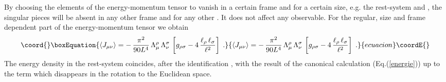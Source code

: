 \documentclass[a4paper,twocolumn,eqsecnum,aps]{revtex4}
\begin{document}
By choosing the elements of the energy-momentum tensor to vanish in a certain frame 
and for a certain size, e.g. the rest-system and  \coordHE{} , the singular pieces will be absent 
in any other frame and for any other \coordHE{}. It does not affect any observable. For the regular, size and frame dependent part of the energy-momentum tensor we obtain   
\begin{equation}\coord{}\boxEquation{
  \label{energy2}
\langle J_{\mu\nu}\rangle = - \,\frac{\pi^2}{90 L^4}\, \Lambda_{\mu}^{\rho} \,
\Lambda_{\nu}^{\sigma} \,\left[g_{\rho\sigma}-4 \,\frac{\ell _{\rho}\, \ell _{\sigma}}{\ell^2}\right]\; .}{
  \langle J_{\mu\nu}\rangle = - \,\frac{\pi^2}{90 L^4}\, \Lambda_{\mu}^{\rho} \,
\Lambda_{\nu}^{\sigma} \,\left[g_{\rho\sigma}-4 \,\frac{\ell _{\rho}\, \ell _{\sigma}}{\ell^2}\right]\; .}{ecuacion}\coordE{}\end{equation}
The energy density in the rest-system  coincides, after  the identification
 \coordHE{}, with the result of the canonical calculation (Eq.(\ref{energie})) 
 up to the \coordHE{} term which disappears in the rotation to the Euclidean space. 
\end{document}
